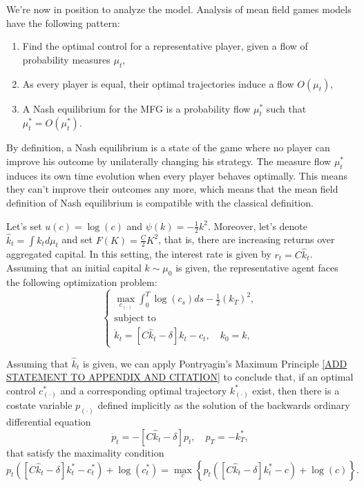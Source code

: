 \documentclass{article}
\begin{document}
We're now in position to analyze the model. Analysis of mean field games models have the following pattern:
\begin{enumerate}
    \item Find the optimal control for a representative player, given a flow of probability measures $\mu_t$,
    \item As every player is equal, their optimal trajectories induce a flow $O(\mu_t)$,
    \item A Nash equilibrium for the MFG is a probability flow $\mu_t^*$ such that $\mu_t^* = O(\mu_t^*)$.
\end{enumerate}
By definition, a Nash equilibrium is a state of the game where no player can improve his outcome by unilaterally changing his strategy.
The measure flow $\mu_t^*$ induces its own time evolution when every player behaves optimally.
This means they can't improve their outcomes any more,
which means that the mean field definition of Nash equilibrium is compatible with the classical definition.
 
Let's set $u(c) = \log(c)$ and $\psi(k) = - \frac{1}{2} k^2$.
Moreover, let's denote $\hat k_t = \int k_t d \mu_t$ and set $F(K) = \frac{C}{2} K^2$, that is, there are increasing returns over aggregated capital.
In this setting, the interest rate is given by $r_t = C {\hat k_t} $.
Assuming that an initial capital $k \sim \mu_0$ is given,
the representative agent faces the following optimization problem:
\begin{equation}\label{economic_example:representative_agent}
    \begin{cases}
        \max_{c_{(\cdot)}} \int_0^T \log(c_s) ds -\frac{1}{2}(k_T)^2,\\
        \text{subject to}\\
        \dot k_t = \left[ C {\hat k_t} - \delta \right] k_t - c_t, \quad k_0 = k,
    \end{cases}
\end{equation}


Assuming that ${\hat k_t}$ is given, we can apply Pontryagin's Maximum Principle \ref{ADD STATEMENT TO APPENDIX AND CITATION}
to conclude that, if an optimal control $c^*_{(\cdot)}$ and a corresponding optimal trajectory $k^*_{(\cdot)}$ exist,
then there is a costate variable $p_{(\cdot)}$ defined implicitly as the solution of the backwards ordinary differential equation
\begin{equation}\label{economic_example:costate_ode}
    \dot p_t = -  \left[C{\hat k_t} - \delta \right] p_t, \quad p_T =  - k^*_T,
\end{equation}
that satisfy the maximality condition
\begin{equation}\label{economic_example:maximality_condition}
    p_t\left( \left[C {\hat k_t} - \delta \right]k^*_t - c^*_t \right) + \log(c^*_t) = 
    \max_c \left\{ p_t\left( \left[C {\hat k_t} - \delta \right]k^*_t - c \right) + \log(c) \right\}.
\end{equation}
\end{document}
